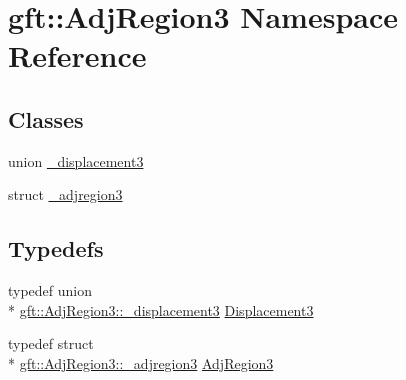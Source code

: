 \hypertarget{namespacegft_1_1AdjRegion3}{\section{gft\-:\-:Adj\-Region3 Namespace Reference}
\label{namespacegft_1_1AdjRegion3}
}
\subsection*{Classes}
\begin{DoxyCompactItemize}
\item 
union \hyperlink{uniongft_1_1AdjRegion3_1_1__displacement3}{\-\_\-displacement3}
\item 
struct \hyperlink{structgft_1_1AdjRegion3_1_1__adjregion3}{\-\_\-adjregion3}
\end{DoxyCompactItemize}
\subsection*{Typedefs}
\begin{DoxyCompactItemize}
\item 
typedef union \\*
\hyperlink{uniongft_1_1AdjRegion3_1_1__displacement3}{gft\-::\-Adj\-Region3\-::\-\_\-displacement3} \hyperlink{namespacegft_1_1AdjRegion3_a36e3b3c33b2dfaebe493f4abf791ee4c}{Displacement3}
\item 
typedef struct \\*
\hyperlink{structgft_1_1AdjRegion3_1_1__adjregion3}{gft\-::\-Adj\-Region3\-::\-\_\-adjregion3} \hyperlink{namespacegft_1_1AdjRegion3_a50e41e32ed23c8a2c4027f2ea29d501b}{Adj\-Region3}
\end{DoxyCompactItemize}
